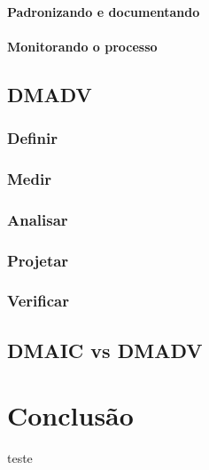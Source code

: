 \documentclass{abnt}
\begin{document}
					\subsubsection {Padronizando e documentando}
					\subsubsection {Monitorando o processo}
			\section {DMADV}
				\subsection {Definir}
				\subsection {Medir}
				\subsection {Analisar}
				\subsection {Projetar}
				\subsection {Verificar}
			\section {DMAIC vs DMADV}
	
	\chapter {Conclusão}
	
	\begin{thebibliography}{99}
		 teste
	\end{thebibliography}
\end{document}
